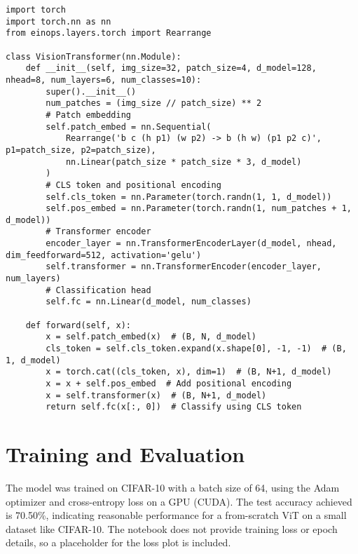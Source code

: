 \documentclass{article}
\begin{document}
\begin{lstlisting}
import torch
import torch.nn as nn
from einops.layers.torch import Rearrange

class VisionTransformer(nn.Module):
    def __init__(self, img_size=32, patch_size=4, d_model=128, nhead=8, num_layers=6, num_classes=10):
        super().__init__()
        num_patches = (img_size // patch_size) ** 2
        # Patch embedding
        self.patch_embed = nn.Sequential(
            Rearrange('b c (h p1) (w p2) -> b (h w) (p1 p2 c)', p1=patch_size, p2=patch_size),
            nn.Linear(patch_size * patch_size * 3, d_model)
        )
        # CLS token and positional encoding
        self.cls_token = nn.Parameter(torch.randn(1, 1, d_model))
        self.pos_embed = nn.Parameter(torch.randn(1, num_patches + 1, d_model))
        # Transformer encoder
        encoder_layer = nn.TransformerEncoderLayer(d_model, nhead, dim_feedforward=512, activation='gelu')
        self.transformer = nn.TransformerEncoder(encoder_layer, num_layers)
        # Classification head
        self.fc = nn.Linear(d_model, num_classes)

    def forward(self, x):
        x = self.patch_embed(x)  # (B, N, d_model)
        cls_token = self.cls_token.expand(x.shape[0], -1, -1)  # (B, 1, d_model)
        x = torch.cat((cls_token, x), dim=1)  # (B, N+1, d_model)
        x = x + self.pos_embed  # Add positional encoding
        x = self.transformer(x)  # (B, N+1, d_model)
        return self.fc(x[:, 0])  # Classify using CLS token
\end{lstlisting}

\section{Training and Evaluation}
The model was trained on CIFAR-10 with a batch size of 64, using the Adam optimizer and cross-entropy loss on a GPU (CUDA). The test accuracy achieved is 70.50\%, indicating reasonable performance for a from-scratch ViT on a small dataset like CIFAR-10. The notebook does not provide training loss or epoch details, so a placeholder for the loss plot is included.
\end{document}
